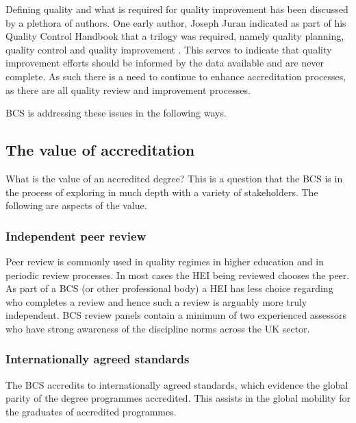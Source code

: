 \documentclass[sigconf]{acmart}
\begin{document}
Defining quality and what is required for quality improvement has been discussed by a plethora of authors. One early author, Joseph Juran indicated as part of his Quality Control Handbook that a trilogy was required, namely quality planning, quality control and quality improvement \cite{juran1962quality}. This serves to indicate that quality improvement efforts should be informed by the data available and are never complete. As such there is a need to continue to enhance accreditation processes, as there are all quality review and improvement processes.

BCS is addressing these issues in the following ways.

\subsection{The value of accreditation}
What is the value of an accredited degree? This is a question that the BCS is in the process of exploring in much depth with a variety of stakeholders. The following are aspects of the value.

\subsubsection{Independent peer review}
Peer review is commonly used in quality regimes in higher education and in periodic review processes. In most cases the HEI being reviewed chooses the peer. As part of a BCS (or other professional body) a HEI has less choice regarding who completes a review and hence such a review is arguably more truly independent. BCS review panels contain a minimum of two experienced assessors who have strong awareness of the discipline norms across the UK sector.

\subsubsection{Internationally agreed standards}
The BCS accredits to internationally agreed standards, which evidence the global parity of the degree programmes accredited.  This assists in the global mobility for the graduates of accredited programmes.
\end{document}
